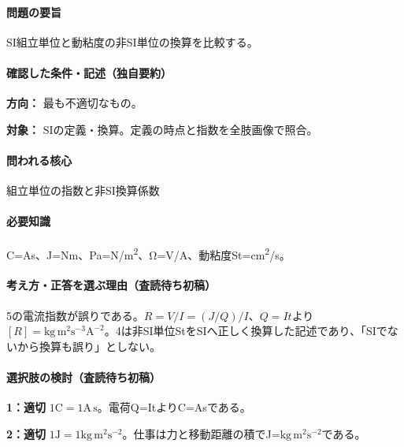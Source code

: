 \paragraph{問題の要旨} SI組立単位と動粘度の非SI単位の換算を比較する。

\paragraph{確認した条件・記述（独自要約）}\mbox{}\par

\noindent\textbf{方向：} 最も不適切なもの。\par

\noindent\textbf{対象：} SIの定義・換算。定義の時点と指数を全肢画像で照合。\par

\paragraph{問われる核心} 組立単位の指数と非SI換算係数

\paragraph{必要知識} C=\allowbreak{}As、J=\allowbreak{}Nm、Pa=\allowbreak{}N/m\textsuperscript{2}、Ω=V/A、動粘度St=\allowbreak{}cm\textsuperscript{2}/s。

\paragraph{考え方・正答を選ぶ理由（査読待ち初稿）} 5の電流指数が誤りである。\(R=V/I=(J/Q)/I\)、\(Q=It\)より\([R]=\mathrm{kg\,m^2s^{-3}A^{-2}}\)。4は非SI単位StをSIへ正しく換算した記述であり、「SIでないから換算も誤り」としない。

\paragraph{選択肢の検討（査読待ち初稿）}\mbox{}\par

\noindent\textbf{1：適切} \(1\mathrm C=1\mathrm{A\,s}\)。電荷Q=\allowbreak{}ItよりC=\allowbreak{}Asである。\par

\noindent\textbf{2：適切} \(1\mathrm J=1\mathrm{kg\,m^2s^{-2}}\)。仕事は力と移動距離の積でJ=\(\mathrm{kg\,m^2s^{-2}}\)である。\par

